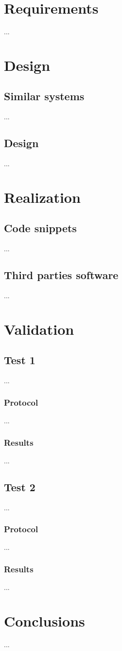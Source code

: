 \documentclass[binding=0.6cm,LaM]{sapthesis}
\begin{document}
\chapter{Requirements}
...
	
	
\chapter{Design}
\section{Similar systems}
...
\section{Design}
...

\chapter{Realization}
\section{Code snippets}
...
\section{Third parties software}
...


\chapter{Validation}
\section{Test 1}
...
\subsection{Protocol}
...
\subsection{Results}
...
\section{Test 2}
...
\subsection{Protocol}
...
\subsection{Results}
...
\chapter{Conclusions}
...
\backmatter
\cleardoublepage
{} %


\end{document}

